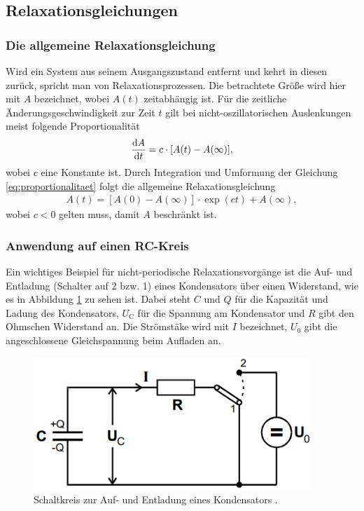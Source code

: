 \subsection{Relaxationsgleichungen}
\subsubsection{Die allgemeine Relaxationsgleichung}
%
Wird ein System aus seinem Ausgangszustand entfernt und kehrt in diesen zurück, spricht man von Relaxationsprozessen.
Die betrachtete Größe wird hier mit $A$ bezeichnet, wobei $A(t)$ zeitabhängig ist.
Für die zeitliche Änderungsgeschwindigkeit zur Zeit $t$ gilt bei nicht-oszillatorischen Auslenkungen meist folgende Proportionalität
\begin{align}
    \label{eq:proportionalitaet}
    \frac{\mathop{}\!\mathrm{d}{A}}{\mathop{}\!\mathrm{d}{t}} = c \cdot [A(t) - A(\infty)],
\end{align}
wobei $c$ eine Konstante ist.
Durch Integration und Umformung der Gleichung \eqref{eq:proportionalitaet} folgt die allgemeine Relaxationsgleichung
\begin{align}
    \label{eq:allg_relaxationsglg}
    A(t) = [A(0) - A(\infty)] \cdot \exp{(ct)} + A(\infty),
\end{align}
wobei $c < 0$ gelten muss, damit $A$ beschränkt ist.

\subsubsection{Anwendung auf einen RC-Kreis}
Ein wichtiges Beispiel für nicht-periodische Relaxationsvorgänge ist die Auf- und Entladung (Schalter auf 2 bzw. 1) eines Kondensators über einen Widerstand, 
wie es in Abbildung \ref{fig:auf_und_entladung} zu sehen ist.
Dabei steht $C$ und $Q$ für die Kapazität und Ladung des Kondensators, $U_\text{C}$ für die Spannung am Kondensator und $R$ gibt den Ohmschen Widerstand an.
Die Strömstäke wird mit $I$ bezeichnet, $U_0$ gibt die angeschlossene Gleichspannung beim Aufladen an.
\begin{figure}[H]
    \centering
    \includegraphics[height = 5cm]{./abbildungen/auf und entladung.png}
    \caption{Schaltkreis zur Auf- und Entladung eines Kondensators \cite{man:v353}.}
    \label{fig:auf_und_entladung}
\end{figure}


